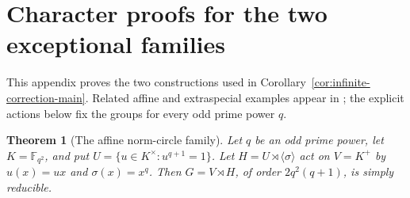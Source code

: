 \documentclass[11pt,a4paper]{amsart}
\newtheorem{thm}{Theorem}[section]
\theoremstyle{definition}
\theoremstyle{remark}
\numberwithin{equation}{section}
\begin{document}
\clearpage
\section{Character proofs for the two exceptional families}\label{app:arithmetic-families}
This appendix proves the two constructions used in
Corollary~\ref{cor:infinite-correction-main}. Related affine and
extraspecial examples appear in \cite[Chapter~XXVI, pp.~453--454]{BKZ19};
the explicit actions below fix the groups for every odd prime power $q$.

\begin{thm}[The affine norm-circle family]\label{thm:arithmetic-norm-circle}
Let $q$ be an odd prime power, let $K=\mathbb F_{q^2}$, and put
$U=\{u\in K^\times:u^{q+1}=1\}$.
Let $H=U\rtimes\langle\sigma\rangle$ act on $V=K^+$ by
$u(x)=ux$ and $\sigma(x)=x^q$.
Then $G=V\rtimes H$, of order $2q^2(q+1)$, is simply reducible.
\end{thm}
\end{document}
